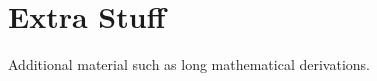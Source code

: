 \documentclass[11pt,a4paper]{book}
\begin{document}
\appendix
\chapter{Extra Stuff}
\label{s:ExtraStuff}

Additional material such as long mathematical derivations.




\end{document}

